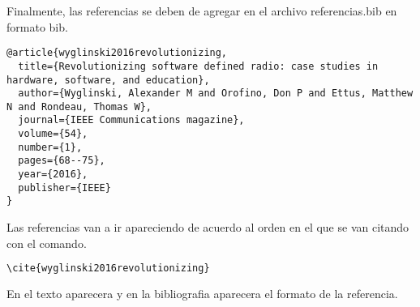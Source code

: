 \documentclass[12pt]{difu100cia} %
\begin{document}
Finalmente, las referencias se deben de agregar en el archivo referencias.bib en formato bib. 

\begin{lstlisting}
@article{wyglinski2016revolutionizing,
  title={Revolutionizing software defined radio: case studies in hardware, software, and education},
  author={Wyglinski, Alexander M and Orofino, Don P and Ettus, Matthew N and Rondeau, Thomas W},
  journal={IEEE Communications magazine},
  volume={54},
  number={1},
  pages={68--75},
  year={2016},
  publisher={IEEE}
}
\end{lstlisting}

Las referencias van a ir apareciendo de acuerdo al orden en el que se van citando con el comando.

\begin{lstlisting}[language=bash]
    \cite{wyglinski2016revolutionizing}
\end{lstlisting}

En el texto aparecera \cite{wyglinski2016revolutionizing} y en la bibliografia aparecera el formato de la referencia.


\printbibliography

\end{document}

